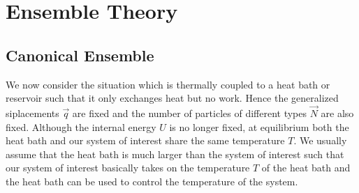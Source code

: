 \documentclass[12pt, a4paper, oneside, openright, titlepage]{book}
\begin{document}
\chapter{Ensemble Theory}


\section{Canonical Ensemble}


We now consider the situation which is thermally coupled to a heat bath or reservoir such that it only exchanges heat but no work. Hence the generalized siplacements $\vec{q}$ are fixed and the number of particles of different types $\vec{N}$ are also fixed. Although the internal energy $U$ is no longer fixed, at equilibrium both the heat bath and our system of interest share the same temperature $T$. We usually assume that the heat bath is much larger than the system of interest such that our system of interest basically takes on the temperature $T$ of the heat bath and the heat bath can be used to control the temperature of the system.
\end{document}
